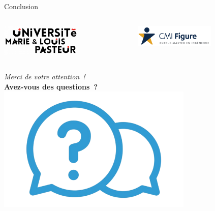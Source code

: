 \begin{frame}{Conclusion}
	\vspace*{-0.3cm}
	\begin{columns}
		\begin{center}
			\includegraphics[width=0.6\textwidth]{images/logo_univ.png}
		\end{center}
		
		\begin{center}
			\includegraphics[width=0.6\textwidth]{images/logo_CMI.png}
		\end{center}
		
	\end{columns}
	\vspace*{0.2cm}
	
	\centering
	\emph{Merci de votre attention~!}\\
	\vspace{0.6cm}
	\textbf{Avez-vous des questions~?}
	\includegraphics[width=0.7\textwidth]{images/questions.png}
\end{frame}

